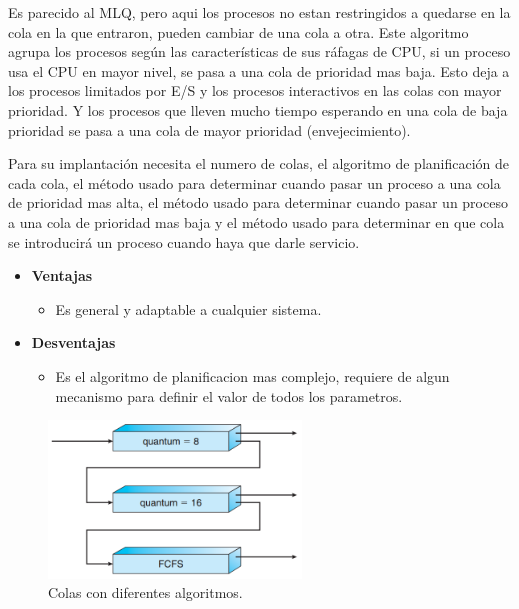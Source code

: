 \documentclass{article}
\begin{document}
Es parecido al MLQ, pero aqui los procesos no estan restringidos a quedarse en la cola en la que entraron,
pueden cambiar de una cola a otra.
Este algoritmo agrupa los procesos según las características de sus ráfagas de CPU, si un proceso
usa el CPU en mayor nivel, se pasa a una cola de prioridad mas baja. Esto deja a los procesos
limitados por E/S y los procesos interactivos en las colas con mayor prioridad.
Y los procesos que lleven mucho tiempo esperando en una cola de baja prioridad se pasa a una
cola de mayor prioridad (envejecimiento).

Para su implantación necesita el numero de colas, el algoritmo de planificación de cada cola,
el método usado para determinar cuando pasar un proceso a una cola de prioridad mas alta,
el método usado para determinar cuando pasar un proceso a una cola de prioridad mas baja
y el método usado para determinar en que cola se introducirá un proceso cuando haya que darle
servicio.

\begin{itemize}
	\item \textbf{Ventajas}
	\begin{itemize}
		\item Es general y adaptable a cualquier sistema.
	\end{itemize}
	
	\item \textbf{Desventajas}
	\begin{itemize}
		\item Es el algoritmo de planificacion mas complejo, requiere de algun mecanismo
		para definir el valor de todos los parametros.
	\end{itemize}
\end{itemize}

\vspace{0.1cm}
\begin{figure}[h]
	\centering
	\includegraphics[width=0.6\textwidth]{img/mlfq}
	\caption{\label{img:mlq}Colas con diferentes algoritmos.}
\end{figure}
\end{document}
